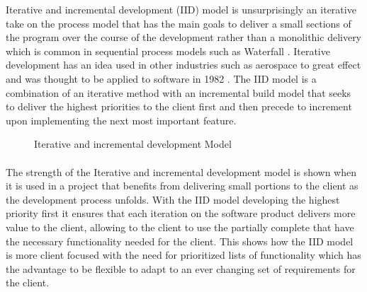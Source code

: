 \documentclass{style/CRPITStyle}
\renewcommand{\cite}{\citep}
\begin{document}
Iterative and incremental development (IID) model is unsurprisingly an iterative take on the
process model that has the main goals to deliver a small sections of the program
over the course of the development rather than a monolithic delivery which is
common in sequential process models such as Waterfall \cite{greer:2004:iid}.
Iterative development has an idea used in other industries such as aerospace to 
great effect and was thought to be applied to software in 1982 \cite{larman:2003:iid}.
The IID model is a combination of an iterative method with an incremental build
model that seeks to deliver the highest priorities to the client first and then
precede to increment upon implementing the next most important feature.

\vspace{.1in}

\begin{figure}[htb]
\caption{\protect\label{iid} Iterative and incremental development Model}
\end{figure}

\vspace{.1in}


\paragraph{}

The strength of the Iterative and incremental development model is shown when it
is used in a project that benefits from delivering small portions to the client
as the development process unfolds. With the IID model developing the highest
priority first it ensures that each iteration on the software product delivers
more value to the client, allowing to the client to use the partially complete
that have the necessary functionality needed for the client.
This shows how the IID model is more client focused with the need for
prioritized lists of functionality which has the advantage to be flexible to
adapt to an ever changing set of requirements for the client.
\end{document}
